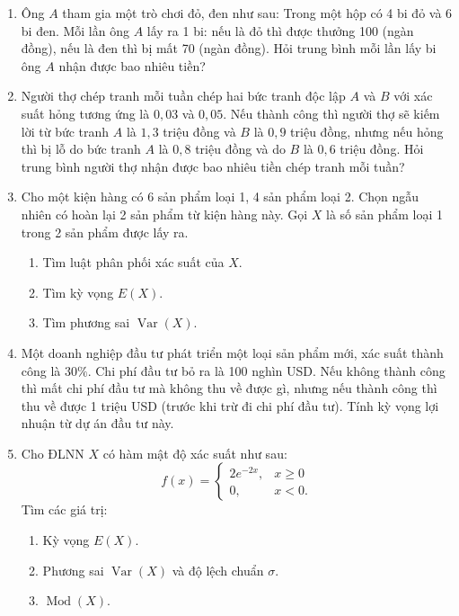 \documentclass[12pt,a4paper]{article}
\theoremstyle{definition}
\begin{document}
\begin{enumerate}[label=\textbf{\arabic*.}]
    \item Ông $A$ tham gia một trò chơi đỏ, đen như sau: Trong một hộp có 4 bi đỏ và 6 bi đen. Mỗi lần ông $A$ lấy ra 1 bi: nếu là đỏ thì được thưởng 100 (ngàn đồng), nếu là đen thì bị mất 70 (ngàn đồng). Hỏi trung bình mỗi lần lấy bi ông $A$ nhận được bao nhiêu tiền?

    \item Người thợ chép tranh mỗi tuần chép hai bức tranh độc lập $A$ và $B$ với xác suất hỏng tương ứng là $0{,}03$ và $0{,}05$. Nếu thành công thì người thợ sẽ kiếm lời từ bức tranh $A$ là $1{,}3$ triệu đồng và $B$ là $0{,}9$ triệu đồng, nhưng nếu hỏng thì bị lỗ do bức tranh $A$ là $0{,}8$ triệu đồng và do $B$ là $0{,}6$ triệu đồng. Hỏi trung bình người thợ nhận được bao nhiêu tiền chép tranh mỗi tuần?

    \item Cho một kiện hàng có 6 sản phẩm loại 1, 4 sản phẩm loại 2. Chọn ngẫu nhiên có hoàn lại 2 sản phẩm từ kiện hàng này. Gọi $X$ là số sản phẩm loại 1 trong 2 sản phẩm được lấy ra.
    \begin{enumerate}[label=\arabic*)]
        \item Tìm luật phân phối xác suất của $X$.
        \item Tìm kỳ vọng $E(X)$.
        \item Tìm phương sai $\operatorname{Var}(X)$.
    \end{enumerate}

    \item Một doanh nghiệp đầu tư phát triển một loại sản phẩm mới, xác suất thành công là $30\%$. Chi phí đầu tư bỏ ra là 100 nghìn USD. Nếu không thành công thì mất chi phí đầu tư mà không thu về được gì, nhưng nếu thành công thì thu về được 1 triệu USD (trước khi trừ đi chi phí đầu tư). Tính kỳ vọng lợi nhuận từ dự án đầu tư này.

    \item Cho ĐLNN $X$ có hàm mật độ xác suất như sau:
    \[
    f(x) = \begin{cases}
    2e^{-2x}, & x \ge 0 \\
    0, & x < 0.
    \end{cases}
    \]
    Tìm các giá trị:
    \begin{enumerate}[label=\arabic*)]
        \item Kỳ vọng $E(X)$.
        \item Phương sai $\operatorname{Var}(X)$ và độ lệch chuẩn $\sigma$.
        \item $\operatorname{Mod}(X)$.
    \end{enumerate}
\end{enumerate}
\end{document}
